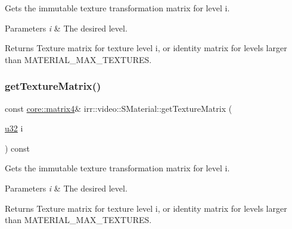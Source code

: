 Gets the immutable texture transformation matrix for level i. 


\begin{DoxyParams}{Parameters}
{\em i} & The desired level. \\
\hline
\end{DoxyParams}
\begin{DoxyReturn}{Returns}
Texture matrix for texture level i, or identity matrix for levels larger than M\+A\+T\+E\+R\+I\+A\+L\+\_\+\+M\+A\+X\+\_\+\+T\+E\+X\+T\+U\+R\+ES. 
\end{DoxyReturn}
\mbox{\label{classirr_1_1video_1_1SMaterial_a6b0adff4b14c80da0be8e8d600252fcd}} 
\subsubsection{\texorpdfstring{get\+Texture\+Matrix()}{getTextureMatrix()}\hspace{0.1cm}{\footnotesize\ttfamily [4/4]}}
{\footnotesize\ttfamily const \hyperlink{namespaceirr_1_1core_a4c9d4e29899535971052810954a14431}{core\+::matrix4}\& irr\+::video\+::\+S\+Material\+::get\+Texture\+Matrix (\begin{DoxyParamCaption}\item[{\hyperlink{namespaceirr_a0416a53257075833e7002efd0a18e804}{u32}}]{i }\end{DoxyParamCaption}) const\hspace{0.3cm}{\ttfamily [inline]}}



Gets the immutable texture transformation matrix for level i. 


\begin{DoxyParams}{Parameters}
{\em i} & The desired level. \\
\hline
\end{DoxyParams}
\begin{DoxyReturn}{Returns}
Texture matrix for texture level i, or identity matrix for levels larger than M\+A\+T\+E\+R\+I\+A\+L\+\_\+\+M\+A\+X\+\_\+\+T\+E\+X\+T\+U\+R\+ES. 
\end{DoxyReturn}
\mbox{\label{classirr_1_1video_1_1SMaterial_aeb4cd5880d7fbf330dc4d5cca0177407}} 
